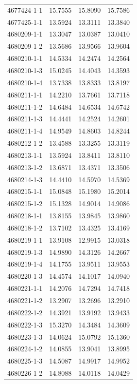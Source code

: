 \begin{longtable}{lrrr}
4677424-1-1 & 15.7555 & 15.8090 & 15.7586 \\
4677425-1-1 & 13.5924 & 13.3111 & 13.3840 \\
4680209-1-1 & 13.3047 & 13.0387 & 13.0410 \\
4680209-1-2 & 13.5686 & 13.9566 & 13.9604 \\
4680210-1-1 & 14.5334 & 14.2474 & 14.2564 \\
4680210-1-3 & 15.0245 & 14.4043 & 14.3593 \\
4680210-1-4 & 13.7338 & 13.8333 & 13.8197 \\
4680211-1-1 & 14.2210 & 13.7661 & 13.7118 \\
4680211-1-2 & 14.6484 & 14.6534 & 14.6742 \\
4680211-1-3 & 14.4441 & 14.2524 & 14.2601 \\
4680211-1-4 & 14.9549 & 14.8603 & 14.8244 \\
4680212-1-2 & 13.4588 & 13.3255 & 13.3119 \\
4680213-1-1 & 13.5924 & 13.8411 & 13.8110 \\
4680213-1-2 & 13.6871 & 13.4371 & 13.3506 \\
4680214-1-3 & 14.4410 & 14.5970 & 14.5369 \\
4680215-1-1 & 15.0848 & 15.1980 & 15.2014 \\
4680215-1-2 & 15.1328 & 14.9014 & 14.9086 \\
4680218-1-1 & 13.8155 & 13.9845 & 13.9860 \\
4680218-1-2 & 13.7102 & 13.4325 & 13.4169 \\
4680219-1-1 & 13.9108 & 12.9915 & 13.0318 \\
4680219-1-3 & 14.9890 & 14.3126 & 14.2667 \\
4680219-1-4 & 14.1755 & 13.9511 & 13.9553 \\
4680220-1-3 & 14.4574 & 14.1017 & 14.0940 \\
4680221-1-1 & 14.2076 & 14.7294 & 14.7418 \\
4680221-1-2 & 13.2907 & 13.2696 & 13.2910 \\
4680222-1-2 & 14.3921 & 13.9192 & 13.9433 \\
4680222-1-3 & 15.3270 & 14.3484 & 14.3609 \\
4680223-1-3 & 14.0624 & 15.0792 & 15.1360 \\
4680224-1-2 & 14.0855 & 13.9041 & 13.8995 \\
4680225-1-3 & 14.5087 & 14.9917 & 14.9952 \\
4680226-1-2 & 14.8088 & 14.0118 & 14.0429 \\

\end{longtable}
